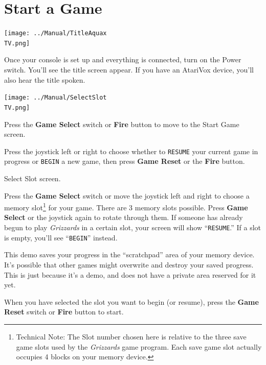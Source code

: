 \documentclass[10pt,twocolumn,openany,article]{memoir}
\newcommand\TV{NTSC}
\newcommand\TV{PAL}
\newcommand\TV{SECAM}
\begin{document}
\section{Start a Game}

\begin{center}
  \texttt{[image: ../Manual/TitleAquax\\TV.png]}
\end{center}

Once your  console is set  up and everything  is connected, turn  on the
Power  switch. You'll  see  the  title screen  appear.  If  you have  an
AtariVox device, you'll also hear the title spoken.


\begin{center}
  \texttt{[image: ../Manual/SelectSlot\\TV.png]}
\end{center}

Press the \textbf{Game Select} switch or \textbf{Fire} button to move to
the
\ifdefined\NOSAVE
Start Game screen.

Press the  joystick left or  right to choose whether  to \texttt{RESUME}
your current game  in progress or \texttt{BEGIN} a new  game, then press
\textbf{Game Reset} or the \textbf{Fire} button.

\else
Select Slot screen.

Press  the \textbf{Game  Select} switch  or move  the joystick  left and
right to choose  a memory slot\footnote{Technical Note:  The Slot number
  chosen  here is  relative to  the three  save game  slots used  by the
  \textit{Grizzards} game program. Each save game slot actually occupies
  4 blocks  on your memory  device.} for your  game. There are  3 memory
slots  possible. Press  \textbf{Game Select}  or the  joystick again  to
rotate   through  them.   If   someone  has   already   begun  to   play
\textit{Grizzards}   in  a   certain   slot,  your   screen  will   show
``\texttt{RESUME}.''    If    a    slot    is    empty,    you'll    see
``\texttt{BEGIN}'' instead.

\ifdefined\DEMO
\skip
This  demo  saves your  progress  in  the  ``scratchpad'' area  of  your
memory  device.  It's possible  that  other  games might  overwrite  and
destroy your saved progress. This is  just because it's a demo, and does
not have a private area reserved for it yet.
\skip
\fi

When you have selected the slot you want to begin (or resume), press the
\textbf{Game Reset} switch or \textbf{Fire} button to start.
\end{document}
